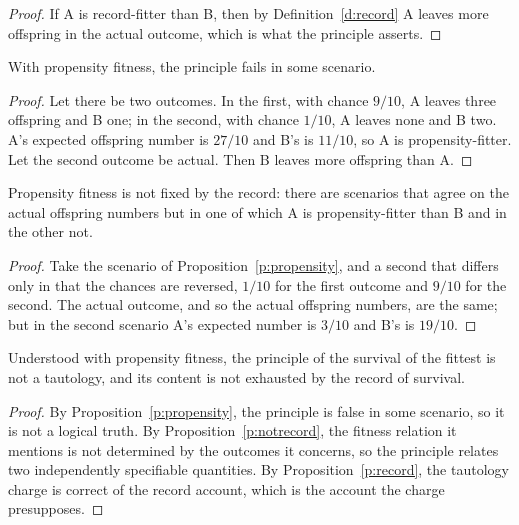 \documentclass{situationist-preprint}
\begin{document}
\begin{proof}
If A is record-fitter than B, then by Definition~\ref{d:record} A leaves more offspring in the actual outcome, which is what the principle asserts.
\end{proof}

\begin{proposition}\label{p:propensity}
With propensity fitness, the principle fails in some scenario.
\end{proposition}

\begin{proof}
Let there be two outcomes. In the first, with chance $9/10$, A leaves three offspring and B one; in the second, with chance $1/10$, A leaves none and B two. A's expected offspring number is $27/10$ and B's is $11/10$, so A is propensity-fitter. Let the second outcome be actual. Then B leaves more offspring than A.
\end{proof}

\begin{proposition}\label{p:notrecord}
Propensity fitness is not fixed by the record: there are scenarios that agree on the actual offspring numbers but in one of which A is propensity-fitter than B and in the other not.
\end{proposition}

\begin{proof}
Take the scenario of Proposition~\ref{p:propensity}, and a second that differs only in that the chances are reversed, $1/10$ for the first outcome and $9/10$ for the second. The actual outcome, and so the actual offspring numbers, are the same; but in the second scenario A's expected number is $3/10$ and B's is $19/10$.
\end{proof}

\begin{theorem}\label{t:main}
Understood with propensity fitness, the principle of the survival of the fittest is not a tautology, and its content is not exhausted by the record of survival.
\end{theorem}

\begin{proof}
By Proposition~\ref{p:propensity}, the principle is false in some scenario, so it is not a logical truth. By Proposition~\ref{p:notrecord}, the fitness relation it mentions is not determined by the outcomes it concerns, so the principle relates two independently specifiable quantities. By Proposition~\ref{p:record}, the tautology charge is correct of the record account, which is the account the charge presupposes.
\end{proof}
\end{document}
